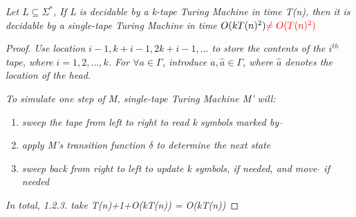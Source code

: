 \documentclass{article}
\begin{document}
\begin{lemma}
    \textit{Let $L\subseteq \Sigma^*$, If L is decidable by a k-tape Turing Machine in time T(n), then it is decidable by a single-tape Turing Machine in time $O(kT(n)^2) \textcolor{red}{\neq O(T(n)^2)}$}

    \begin{proof}
        \textit{Use location $i-1,k+i-1,2k+i-1,...$ to store the contents of the $i^{th}$ tape, where $i = 1,2,...,k$. For $\forall a\in\varGamma$, introduce $a,\widehat{a} \in \varGamma$, where $\widehat{a}$ denotes the location of the head.}

        \textit{To simulate one step of M, single-tape Turing Machine M' will:}

        \begin{enumerate}
            \item \textit{sweep the tape from left to right to read k symbols marked by $\widehat{~}$}
            \item \textit{apply M's transition function $\delta$ to determine the next state}
            \item \textit{sweep back from right to left to update k symbols, if needed, and move $\widehat{}$ if needed}
        \end{enumerate}

        \textit{In total, 1.2.3. take T(n)+1+O(kT(n)) = O(kT(n))}
    \end{proof}
\end{lemma}

\newpage
\end{document}
